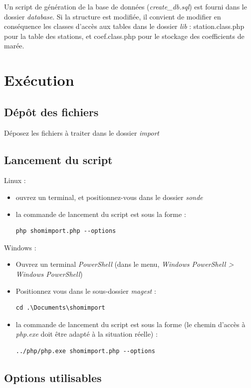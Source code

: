 \documentclass[12pt,a4paper]{article}
\begin{document}
Un script de génération de la base de données (\textit{create\_db.sql}) est fourni dans le dossier \textit{database}.
Si la structure est modifiée, il convient de modifier en conséquence les classes d'accès aux tables dans le dossier \textit{lib} : station.class.php pour la table des stations, et coef.class.php pour le stockage des coefficients de marée. 

\section{Exécution}
\subsection{Dépôt des fichiers}
Déposez les fichiers à traiter dans le dossier \textit{import}

\subsection{Lancement du script}

Linux :
\begin{itemize}
\item ouvrez un terminal, et positionnez-vous dans le dossier \textit{sonde}
\item la commande de lancement du script est sous la forme :
\begin{lstlisting}
php shomimport.php --options
\end{lstlisting}
\end{itemize}

Windows :
\begin{itemize}
\item Ouvrez un terminal \textit{PowerShell} (dans le menu, \textit{Windows PowerShell > Windows PowerShell})
\item Positionnez vous dans le sous-dossier \textit{magest} :
\begin{lstlisting}
cd .\Documents\shomimport
\end{lstlisting}
\item la commande de lancement du script est sous la forme (le chemin d'accès à \textit{php.exe} doit être adapté à la situation réelle) :
\begin{lstlisting}
../php/php.exe shomimport.php --options
\end{lstlisting}
\end{itemize}

\subsection{Options utilisables}
\end{document}
